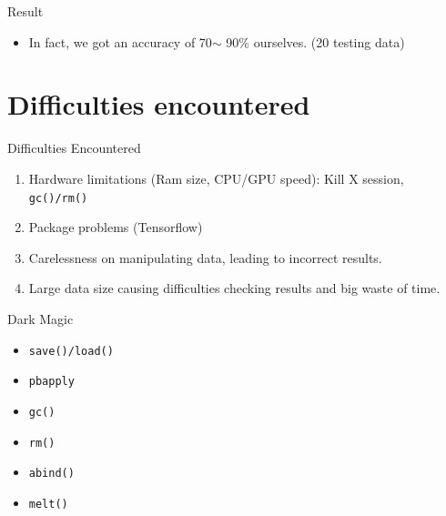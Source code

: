 \documentclass{beamer}
\begin{document}
\begin{frame}{Result}
    \begin{itemize}
        \item In fact, we got an accuracy of 70$\sim$ 90\% ourselves. (20 testing data)
    \end{itemize}
\end{frame}
\section{Difficulties encountered}%
\label{sec:difficulties_encountered}


\begin{frame}{Difficulties Encountered}
	\begin{enumerate}
		\item Hardware limitations (Ram size, CPU/GPU speed): Kill X session, \texttt{gc()/rm()}
		\item Package problems (Tensorflow)
		\item Carelessness on manipulating data, leading to incorrect results.
		\item Large data size causing difficulties checking results and big waste of time.
		

	\end{enumerate}
\end{frame}


\begin{frame}{Dark Magic}
	\begin{itemize}
		\item \texttt{save()/load()}
		\item \texttt{pbapply}
		\item \texttt{gc()}
		\item \texttt{rm()}
		\item \texttt{abind()}
		\item \texttt{melt()}

	\end{itemize}
	
\end{frame}
\end{document}
